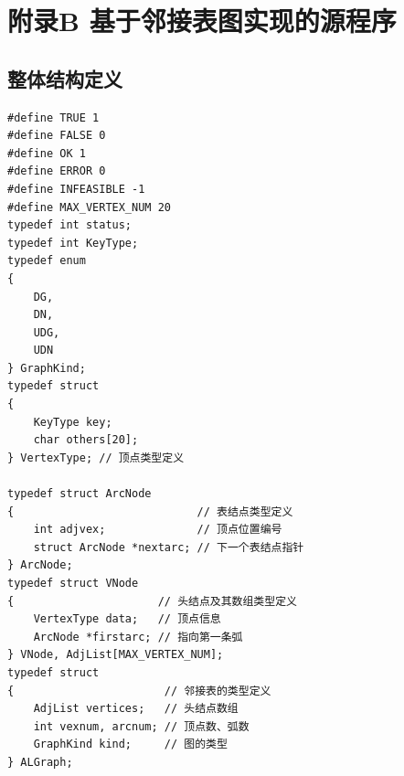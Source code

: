 \documentclass[supercite]{Experimental_Report}
\theoremstyle{definition}
\begin{document}
\section{附录B 基于邻接表图实现的源程序}
\subsection{整体结构定义}
\begin{lstlisting}
#define TRUE 1
#define FALSE 0
#define OK 1
#define ERROR 0
#define INFEASIBLE -1
#define MAX_VERTEX_NUM 20
typedef int status;
typedef int KeyType;
typedef enum
{
    DG,
    DN,
    UDG,
    UDN
} GraphKind;
typedef struct
{
    KeyType key;
    char others[20];
} VertexType; // 顶点类型定义

typedef struct ArcNode
{                            // 表结点类型定义
    int adjvex;              // 顶点位置编号
    struct ArcNode *nextarc; // 下一个表结点指针
} ArcNode;
typedef struct VNode
{                      // 头结点及其数组类型定义
    VertexType data;   // 顶点信息
    ArcNode *firstarc; // 指向第一条弧
} VNode, AdjList[MAX_VERTEX_NUM];
typedef struct
{                       // 邻接表的类型定义
    AdjList vertices;   // 头结点数组
    int vexnum, arcnum; // 顶点数、弧数
    GraphKind kind;     // 图的类型
} ALGraph;
\end{lstlisting}
\newpage
\end{document}
